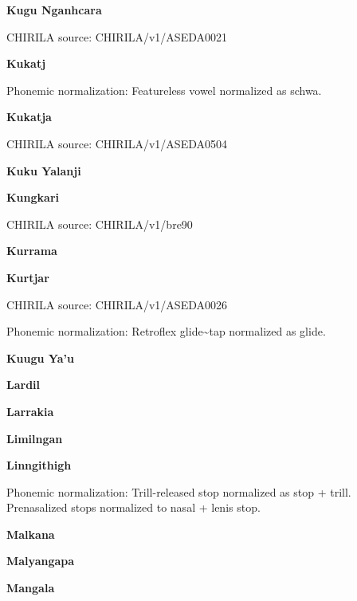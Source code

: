 \textbf{Kugu Nganhcara}

CHIRILA source: CHIRILA/v1/ASEDA0021


\textbf{Kukatj}


Phonemic normalization: Featureless vowel normalized as schwa.

\textbf{Kukatja}

CHIRILA source: CHIRILA/v1/ASEDA0504


\textbf{Kuku Yalanji}


\textbf{Kungkari}

CHIRILA source: CHIRILA/v1/bre90


\textbf{Kurrama}


\textbf{Kurtjar}

CHIRILA source: CHIRILA/v1/ASEDA0026


Phonemic normalization: Retroflex glide\textasciitilde{}tap normalized
as glide.

\textbf{Kuugu Ya'u}


\textbf{Lardil}


\textbf{Larrakia}


\textbf{Limilngan}


\textbf{Linngithigh}


Phonemic normalization: Trill-released stop normalized as stop + trill.
Prenasalized stops normalized to nasal + lenis stop.

\textbf{Malkana}


\textbf{Malyangapa}


\textbf{Mangala}

